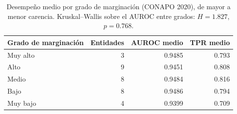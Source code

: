 
\begin{table}[htbp]
\centering
\small
\caption{Desempeño medio por grado de marginación (CONAPO 2020), de mayor a
menor carencia. Kruskal--Wallis sobre el AUROC entre grados:
$H=1.827$, $p=0.768$.}
\label{tab:marginacion}
\begin{tabular}{l r r r}
\toprule
Grado de marginación & Entidades & AUROC medio & TPR medio \\
\midrule
Muy alto & 3 & 0.9485 & 0.793 \\
Alto & 9 & 0.9451 & 0.808 \\
Medio & 8 & 0.9484 & 0.816 \\
Bajo & 8 & 0.9486 & 0.794 \\
Muy bajo & 4 & 0.9399 & 0.709 \\
\bottomrule
\end{tabular}
\end{table}
